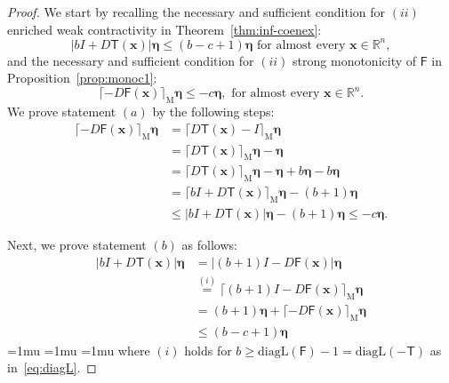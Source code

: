 \documentclass[journal,twoside,web]{ieeecolor}
\makeatletter
\newcommand{\mzr}[1]{\lceil#1\rceil_{\text{M}}}
\newcommand{\abs}[1]{{\left\vert #1 \right\vert}}
\newcommand{\rea }{\mathbb{R}}
\newcommand{\xb}{\boldsymbol{x}}
\newcommand{\etab}{\boldsymbol{\eta}}
\newcommand{\Fs}{\mathsf{F}}
\newcommand{\Ts}{\mathsf{T}}
\newcommand{\diego}[1]{\color{red}{ @Diego: #1} \color{black}}
\makeatother
\begin{document}
\begin{proof}
    We start by recalling the necessary and sufficient condition for $(ii)$ enriched weak contractivity in Theorem~\ref{thm:inf-coenex}:
    $$
    \abs{b I + D\Ts(\xb)}\etab \leq (b-c+1)\etab \text{ for almost every } \xb\in\rea^n,
    $$
    and the necessary and sufficient condition for $(ii)$ strong monotonicity of $\Fs$ in Proposition~\ref{prop:monoc1}:
    $$
    \mzr{-D\Fs(\xb)}\etab \leq -c \etab,\text{ for almost every }\xb \in \rea^n.
    $$
    We prove statement $(a)$ by the following steps:
    \begingroup
    $$
    \begin{aligned}
            \mzr{-D\Fs(\xb)}\etab  &= \mzr{D\Ts(\xb)-I}\etab \\
            &= \mzr{D\Ts(\xb)}\etab - \etab \\
            & = \mzr{D\Ts(\xb)}\etab - \etab + b\etab -  b\etab \\
            & = \mzr{bI+D\Ts(\xb)}\etab - (b+1)\etab \\
            & \leq \abs{bI+D\Ts(\xb)}\etab - (b+1)\etab \leq -c\etab.
    \end{aligned}
    $$
    \endgroup

    Next, we prove statement $(b)$ as follows:
    $$
    \begin{aligned}
    \abs{bI + D\Ts(\xb)}\etab & =  \abs{(b+1)I- D\Fs(\xb)}\etab\\
    & \overset{(i)}{=}  \mzr{(b+1)I- D\Fs(\xb)}\etab\\
    & =  (b+1)\etab + \mzr{- D\Fs(\xb)} \etab\\
    & \leq (b-c+1)\etab
    \end{aligned}
    $$
    \begingroup
\medmuskip=1mu
\thinmuskip=1mu
\thickmuskip=1mu
    where $(i)$ holds for $b\geq \text{diagL}(\Fs)-1 = \text{diagL}(-\Ts)$ as in~\eqref{eq:diagL}.\endgroup
\end{proof}


\end{document}
